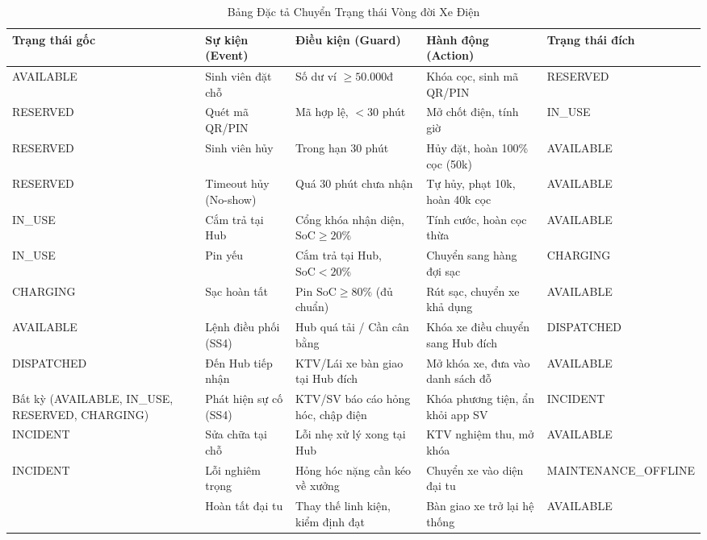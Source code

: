 \documentclass[12pt,a4paper]{article}
\begin{document}
\begin{table}[H]
    \centering
    \small
    \renewcommand{\arraystretch}{1.3}
    \caption{Bảng Đặc tả Chuyển Trạng thái Vòng đời Xe Điện}
    \label{tab:state-ev-spec}
    \footnotesize
    \begin{tabularx}{\textwidth}{|>{\raggedright\arraybackslash}p{2.4cm}|>{\raggedright\arraybackslash}p{2.2cm}|>{\raggedright\arraybackslash}p{2.6cm}|>{\raggedright\arraybackslash}X|>{\raggedright\arraybackslash}p{2.4cm}|}
        \hline
        \textbf{Trạng thái gốc} & \textbf{Sự kiện (Event)} & \textbf{Điều kiện (Guard)} & \textbf{Hành động (Action)} & \textbf{Trạng thái đích} \\
        \hline
        AVAILABLE & Sinh viên đặt chỗ & Số dư ví $\ge 50.000$đ & Khóa cọc, sinh mã QR/PIN & RESERVED \\
        RESERVED & Quét mã QR/PIN & Mã hợp lệ, $< 30$ phút & Mở chốt điện, tính giờ & IN\_USE \\
        RESERVED & Sinh viên hủy & Trong hạn 30 phút & Hủy đặt, hoàn 100\% cọc (50k) & AVAILABLE \\
        RESERVED & Timeout hủy (No-show) & Quá 30 phút chưa nhận & Tự hủy, phạt 10k, hoàn 40k cọc & AVAILABLE \\
        IN\_USE & Cắm trả tại Hub & Cổng khóa nhận diện, $\text{SoC} \ge 20\%$ & Tính cước, hoàn cọc thừa & AVAILABLE \\
        IN\_USE & Pin yếu & Cắm trả tại Hub, $\text{SoC} < 20\%$ & Chuyển sang hàng đợi sạc & CHARGING \\
        CHARGING & Sạc hoàn tất & Pin $\text{SoC} \ge 80\%$ (đủ chuẩn) & Rút sạc, chuyển xe khả dụng & AVAILABLE \\
        AVAILABLE & Lệnh điều phối (SS4) & Hub quá tải / Cần cân bằng & Khóa xe điều chuyển sang Hub đích & DISPATCHED \\
        DISPATCHED & Đến Hub tiếp nhận & KTV/Lái xe bàn giao tại Hub đích & Mở khóa xe, đưa vào danh sách đỗ & AVAILABLE \\
        Bất kỳ (AVAILABLE, IN\_USE, RESERVED, CHARGING) & Phát hiện sự cố (SS4) & KTV/SV báo cáo hỏng hóc, chập điện & Khóa phương tiện, ẩn khỏi app SV & INCIDENT \\
        INCIDENT & Sửa chữa tại chỗ & Lỗi nhẹ xử lý xong tại Hub & KTV nghiệm thu, mở khóa & AVAILABLE \\
        INCIDENT & Lỗi nghiêm trọng & Hỏng hóc nặng cần kéo về xưởng & Chuyển xe vào diện đại tu & {\scriptsize MAINTENANCE\_\allowbreak OFFLINE} \\
        {\scriptsize MAINTENANCE\_\allowbreak OFFLINE} & Hoàn tất đại tu & Thay thế linh kiện, kiểm định đạt & Bàn giao xe trở lại hệ thống & AVAILABLE \\
        \hline
    \end{tabularx}
\end{table}
\end{document}
